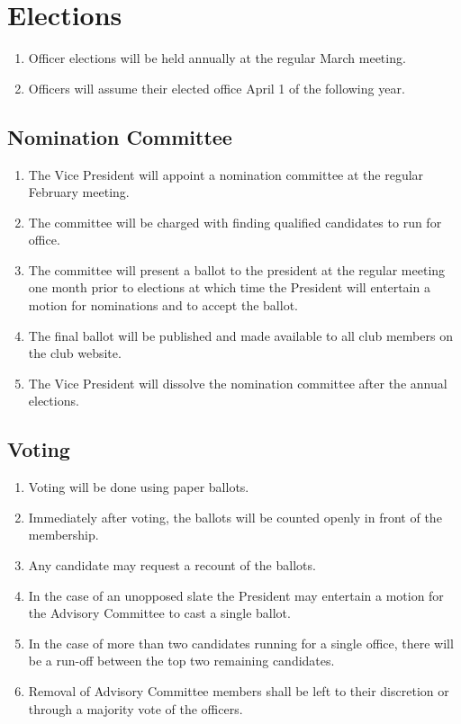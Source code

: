 \documentclass{report}
\begin{document}
\chapter{Elections}
\begin{enumerate}
\item Officer elections will be held annually at the regular March meeting.

\item Officers will assume their elected office April 1 of the following year.
\end{enumerate}

\section{Nomination Committee}
\begin{enumerate}
\item The Vice President will appoint a nomination committee at the regular February meeting.

\item The committee will be charged with finding qualified candidates to run for office.

\item The committee will present a ballot to the president at the regular meeting one month prior to elections at which time the President will entertain a motion for nominations and to accept the ballot.

\item The final ballot will be published and made available to all club members on the club website.

\item The Vice President will dissolve the nomination committee after the annual elections.
\end{enumerate}

\section{Voting}
\begin{enumerate}
\item Voting will be done using paper ballots.

\item Immediately after voting, the ballots will be counted openly in front of the membership.

\item Any candidate may request a recount of the ballots.

\item In the case of an unopposed slate the President may entertain a motion for the Advisory Committee to cast a single ballot.

\item In the case of more than two candidates running for a single office, there will be a run-off between the top two remaining candidates.  

\item Removal of Advisory Committee members shall be left to their discretion or through a majority vote of the officers.
\end{enumerate}
\end{document}
